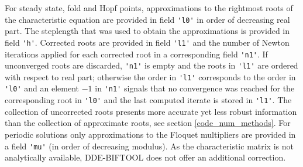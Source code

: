 \documentclass[10pt]{scrartcl}
\newcommand{\DDEBIFCODE}{\textsc{DDE-BIFTOOL}}
\newcommand{\blist}[1]{\mbox{\lstinline!#1!}}
\begin{document}
For steady state, fold and Hopf points, approximations to the
rightmost roots of the characteristic equation are provided in field
\blist{'l0'} in order of decreasing real part.  The steplength that
was used to obtain the approximations is provided in field
\blist{'h'}. Corrected roots are provided in field \blist{'l1'} and
the number of Newton iterations applied for each corrected root in a
corresponding field \blist{'n1'}.  If unconverged roots are discarded,
\blist{'n1'} is empty and the roots in \blist{'l1'} are ordered with
respect to real part; otherwise the order in \blist{'l1'} corresponds
to the order in \blist{'l0'} and an element $-1$ in \blist{'n1'}
signals that no convergence was reached for the corresponding root in
\blist{'l0'} and the last computed iterate is stored in \blist{'l1'}.
The collection of uncorrected roots presents more accurate yet less
robust information than the collection of approximate roots, see
section \ref{code_num_methods}. For periodic solutions only
approximations to the Floquet multipliers are provided in a field
\blist{'mu'} (in order of decreasing modulus). As the characteristic
matrix is not analytically available, \DDEBIFCODE{} does not offer an
additional correction.
\end{document}

